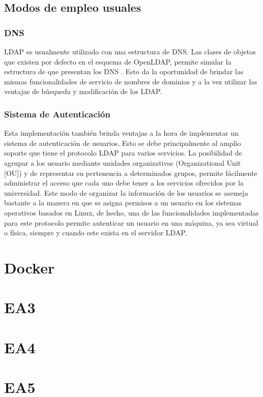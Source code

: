 \subsection{Modos de empleo usuales}
\subsubsection{DNS}
LDAP es usualmente utilizado con una estructura de DNS. Las clases de objetos que existen por defecto en el esquema de OpenLDAP, permite simular la estructura de que presentan los DNS . Esto da la oportunidad de brindar las mismas funcionalidades de servicio de nombres de dominios y a la vez utilizar las ventajas de b\'usqueda y modificaci\'on de los LDAP.

\subsubsection{Sistema de Autenticaci\'on}
Esta implementaci\'on tambi\'en brinda ventajas a la hora de implementar un sistema de autenticaci\'on de usuarios. Esto se debe principalmente al amplio soporte que tiene el protocolo LDAP para varios servicios. La posibilidad de agrupar a los usuario mediante unidades organizativas (Organizational Unit [OU]) y de representar su pertenencia a determinados grupos, permite f\'acilmente administrar el acceso que cada uno debe tener a los servicios ofrecidos por la universidad. Este modo de organizar la informaci\'on de los usuarios se asemeja bastante a la manera en que se asigna permisos a un usuario en los sistemas operativos basados en Linux, de hecho, una de las funcionalidades implementadas para este protocolo permite autenticar un usuario en una m\'aquina, ya sea virtual o f\'isica, siempre y cuando este exista en el servidor LDAP.


\section{Docker}
\section{EA3}
\section{EA4}
\section{EA5}
